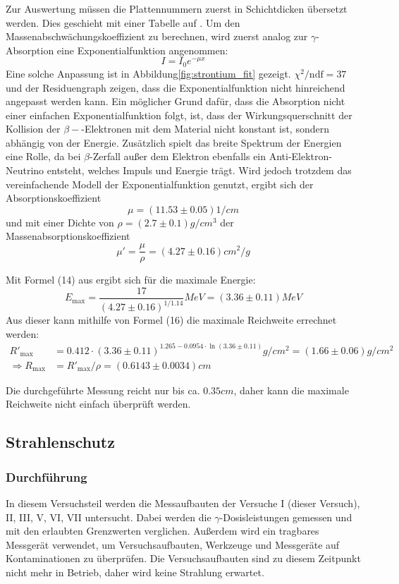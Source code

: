 \documentclass{../Misc/MontavonLaTeX/Montavon}
\begin{document}
Zur Auswertung müssen die Plattennummern zuerst in Schichtdicken übersetzt werden. Dies geschieht mit einer Tabelle auf \cite[S. 25]{anleitung}. 
Um den Massenabschwächungskoeffizient zu berechnen, wird zuerst analog zur $\gamma$-Absorption eine Exponentialfunktion angenommen:
\[
	I = I_0 e^{-\mu x}
\]
Eine solche Anpassung ist in Abbildung\ref{fig:strontium_fit} gezeigt. $\chi^2 / \textrm{ndf} = 37$ und der Residuengraph zeigen, dass die Exponentialfunktion nicht hinreichend angepasst werden kann. Ein möglicher Grund dafür, dass die Absorption nicht einer einfachen Exponentialfunktion folgt, ist, dass der Wirkungsquerschnitt der Kollision der $\beta-$-Elektronen mit dem Material nicht konstant ist, sondern abhängig von der Energie. Zusätzlich spielt das breite Spektrum der Energien eine Rolle, da bei $\beta$-Zerfall außer dem Elektron ebenfalls ein Anti-Elektron-Neutrino entsteht, welches Impuls und Energie trägt.
Wird jedoch trotzdem das vereinfachende Modell der Exponentialfunktion genutzt, ergibt sich der Absorptionskoeffizient
\[
	\mu = (11.53 \pm 0.05) \unit{1/cm}
\]
und mit einer Dichte von $\rho = (2.7 \pm 0.1) \unit{g / cm^3}$ \cite{wiki_aluminium} der Massenabsorptionskoeffizient
\[
	\mu' = \frac{\mu}{\rho} = (4.27 \pm 0.16) \unit{cm^2 / g}
\]

Mit Formel (14) aus \cite[S. 15]{anleitung} ergibt sich für die maximale Energie:
\[
	E_\textrm{max} = \frac{17}{(4.27 \pm 0.16)^{1/1.14}} \unit{MeV} = (3.36 \pm 0.11) \unit{MeV}
\]
Aus dieser kann mithilfe von Formel (16) die maximale Reichweite errechnet werden:
\begin{align*}
	R'_\textrm{max} &= 0.412 \cdot (3.36 \pm 0.11)^{1.265 - 0.0954 \cdot \ln(3.36 \pm 0.11)} \unit{g/cm^2} = (1.66 \pm  0.06) \unit{g/cm^2} \\ \Rightarrow R_\textrm{max} &= R'_\textrm{max} / \rho = (0.6143 \pm 0.0034) \unit{cm}
\end{align*}

Die durchgeführte Messung reicht nur bis ca. $0.35 \unit{cm}$, daher kann die maximale Reichweite nicht einfach überprüft werden.

\subsection{Strahlenschutz}
\subsubsection{Durchführung}
In diesem Versuchsteil werden die Messaufbauten der Versuche I (dieser Versuch), II, III, V, VI, VII untersucht. Dabei werden die $\gamma$-Dosisleistungen gemessen und mit den erlaubten Grenzwerten verglichen. 
Außerdem wird ein tragbares Messgerät verwendet, um Versuchsaufbauten, Werkzeuge und Messgeräte auf Kontaminationen zu überprüfen.
Die Versuchsaufbauten sind zu diesem Zeitpunkt nicht mehr in Betrieb, daher wird keine Strahlung erwartet.
\end{document}
